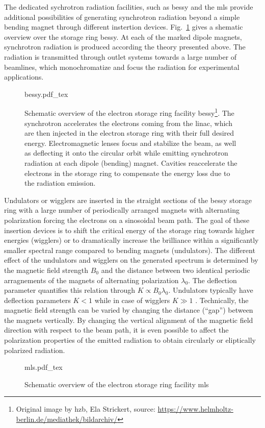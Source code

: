 The dedicated sychrotron radiation facilities, such as \gls{bessy} and the \gls{mls} provide additional possibilities of generating synchrotron radiation beyond a simple bending magnet through different instertion devices. Fig.~\ref{ch_exp:fig_bessy2} gives a shematic overview over the storage ring \gls{bessy}. At each of the marked dipole magnets, synchrotron radiation is produced according the theory presented above. The radiation is transmitted through outlet systems towards a large number of beamlines, which monochromatize and focus the radiation for experimental applications.
\begin{figure}[htb]
    \def\svgwidth{0.7\textwidth}
    {bessy.pdf_tex}
    \caption[Schematic overview of BESSY II.]{Schematic overview of the electron storage ring facility \gls{bessy}\footnote{Original image by \gls{hzb}, Ela Strickert, source: \url{https://www.helmholtz-berlin.de/mediathek/bildarchiv/}}. The synchrotron accelerates the electrons coming from the \gls{linac}, which are then injected in the electron storage ring with their full desired energy. Electromagnetic lenses focus and stabilize the beam, as well as deflecting it onto the circular orbit while emitting synchrotron radiation at each dipole (bending) magnet. Cavities reaccelerate the electrons in the storage ring to compensate the energy loss due to the radiation emission.}
    \label{ch_exp:fig_bessy2}
\end{figure}
Undulators or wigglers are inserted in the straight sections of the \gls{bessy} storage ring with a large number of periodically arranged magnets with alternating polarization forcing the electrons on a sinosoidal beam path. The goal of these insertion devices is to shift the critical energy of the storage ring towards higher energies (wigglers) or to dramatically increase the brilliance within a significantly smaller spectral range compared to bending magnets (undulators). The different effect of the undulators and wigglers on the generated spectrum is determined by the magnetic field strength $B_0$ and the distance between two identical periodic arragnements of the magnets of alternating polarization $\lambda_0$. The deflection parameter quantifies this relation through $K \propto B_0 \lambda_0$. Undulators typically have deflection parameters $K < 1$ while in case of wigglers $K \gg 1$ \cite{munro_chapter_1987}. Technically, the magnetic field strength can be varied by changing the distance (``gap'') between the magnets vertically. By changing the vertical alignment of the magnetic field direction with respect to the beam path, it is even possible to affect the polarization properties of the emitted radiation to obtain circularly or eliptically polarized radiation.
\begin{figure}[htb]
    \def\svgwidth{0.7\textwidth}
    {mls.pdf_tex}
    \caption[Schematic overview of the MLS]{Schematic overview of the electron storage ring facility \gls{mls}}
    \label{ch_exp:fig_mls}
\end{figure}


